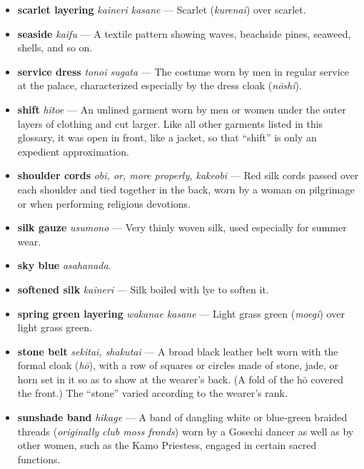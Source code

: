 \documentclass{article}
\begin{document}
\begin{multicols}{3}
\begin{footnotesize}
\begin{itemize}[
			label=,
			leftmargin=0em,
			rightmargin=-1.5em,
			itemindent=-2em,
			nosep,
		]
		\item \textbf{scarlet layering} \textit{kaineri kasane} --- Scarlet (\textit{kurenai}) over scarlet.

		\item \textbf{seaside} \textit{kaifu} --- A textile pattern showing waves, beachside pines, seaweed, shells, and so on.

		\item \textbf{service dress} \textit{tonoi sugata} --- The costume worn by men in regular service at the palace, characterized especially by the dress cloak (\textit{nōshi}).

		\item \textbf{shift} \textit{hitoe} --- An unlined garment worn by men or women under the outer layers of clothing and cut larger. Like all other garments listed in this glossary, it was open in front, like a jacket, so that “shift” is only an expedient approximation.

		\item \textbf{shoulder cords} \textit{obi, or, more properly, kakeobi} --- Red silk cords passed over each shoulder and tied together in the back, worn by a woman on pilgrimage or when performing religious devotions.

		\item \textbf{silk gauze} \textit{usumono} --- Very thinly woven silk, used especially for summer wear.

		\item \textbf{sky blue} \textit{asahanada}.

		\item \textbf{softened silk} \textit{kaineri} --- Silk boiled with lye to soften it.

		\item \textbf{spring green layering} \textit{wakanae kasane} --- Light grass green (\textit{moegi}) over light grass green.

		\item \textbf{stone belt} \textit{sekitai, shakutai} --- A broad black leather belt worn with the formal cloak (\textit{hō}), with a row of squares or circles made of stone, jade, or horn set in it so as to show at the wearer's back. (A fold of the hō covered the front.) The “stone” varied according to the wearer's rank.

		\item \textbf{sunshade band} \textit{hikage} --- A band of dangling white or blue-green braided threads (\textit{originally club moss fronds}) worn by a Gosechi dancer as well as by other women, such as the Kamo Priestess, engaged in certain sacred functions.


\end{itemize}
\end{footnotesize}
\end{multicols}
\end{document}
